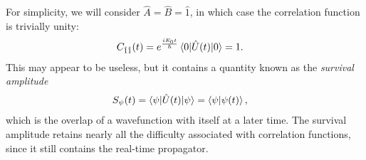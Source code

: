 For simplicity, we will consider $\hat{A} = \hat{B} = \hat{1}$, in which case the correlation function is trivially unity:
\begin{align}
	C_{\hat{1} \hat{1}}(t)
	&= e^{\frac{i E_0 t}{\hbar}} \braket{0 | \hat{U}(t) | 0}
	= 1.
\end{align}
This may appear to be useless, but it contains a quantity known as the \emph{survival amplitude}~\cite{issack2007semiclassical}
\begin{align}
	S_{\psi}(t)
	&= \braket{\psi | \hat{U}(t) | \psi}
	= \braket{\psi | \psi(t)},
\end{align}
which is the overlap of a wavefunction with itself at a later time.
The survival amplitude retains nearly all the difficulty associated with correlation functions, since it still contains the real-time propagator.

